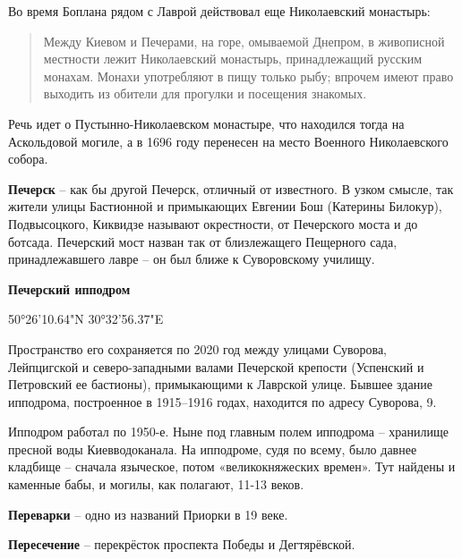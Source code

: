 Во время Боплана рядом с Лаврой действовал еще Николаевский монастырь:

\begin{quotation}
Между Киевом и Печерами, на горе, омываемой Днепром, в живописной местности лежит Николаевский монастырь, принадлежащий русским монахам. Монахи употребляют в пищу только рыбу; впрочем имеют право выходить из обители для прогулки и посещения знакомых.
\end{quotation}

Речь идет о Пустынно-Николаевском монастыре, что находился тогда на Аскольдовой могиле, а в 1696 году перенесен на место Военного Николаевского собора.\\

\medskip

\textbf{Печерск} – как бы другой Печерск, отличный от известного. В узком смысле, так жители улицы Бастионной и примыкающих Евгении Бош (Катерины Билокур), Подвысоцкого, Киквидзе называют окрестности, от Печерского моста и до ботсада. Печерский мост назван так от близлежащего Пещерного сада, принадлежавшего лавре – он был ближе к Суворовскому училищу.\\ 

\medskip

\textbf{Печерский ипподром}

50°26'10.64"N 30°32'56.37"E

Пространство его сохраняется по 2020 год между улицами Суворова, Лейпцигской и северо-западными валами Печерской крепости (Успенский и Петровский ее бастионы), примыкающими к Лаврской улице. Бывшее здание ипподрома, построенное в 1915–1916 годах, находится по адресу Суворова, 9.

Ипподром работал по 1950-е. Ныне под главным полем ипподрома – хранилище пресной воды Киевводоканала. На ипподроме, судя по всему, было давнее кладбище – сначала языческое, потом «великокняжеских времен». Тут найдены и каменные бабы, и могилы, как полагают, 11-13 веков.\\

\medskip

\textbf{Переварки} – одно из названий Приорки в 19 веке.\\

\medskip

\textbf{Пересечение} – перекрёсток проспекта Победы и Дегтярёвской.\\

\medskip


